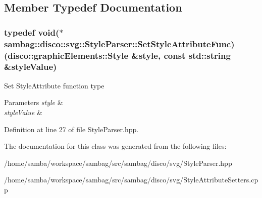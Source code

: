 \subsection{Member Typedef Documentation}
\hypertarget{classsambag_1_1disco_1_1svg_1_1_style_parser_aefae8d683c18953670e2cba8471a8c93}{
\subsubsection[{SetStyleAttributeFunc}]{\setlength{\rightskip}{0pt plus 5cm}typedef void($\ast$ {\bf sambag::disco::svg::StyleParser::SetStyleAttributeFunc})({\bf disco::graphicElements::Style} \&style, const std::string \&styleValue)}}
\label{classsambag_1_1disco_1_1svg_1_1_style_parser_aefae8d683c18953670e2cba8471a8c93}
Set StyleAttribute function type 
\begin{DoxyParams}{Parameters}
{\em style} & \\
\hline
{\em styleValue} & \\
\hline
\end{DoxyParams}


Definition at line 27 of file StyleParser.hpp.



The documentation for this class was generated from the following files:\begin{DoxyCompactItemize}
\item 
/home/samba/workspace/sambag/src/sambag/disco/svg/StyleParser.hpp\item 
/home/samba/workspace/sambag/src/sambag/disco/svg/StyleAttributeSetters.cpp\end{DoxyCompactItemize}
